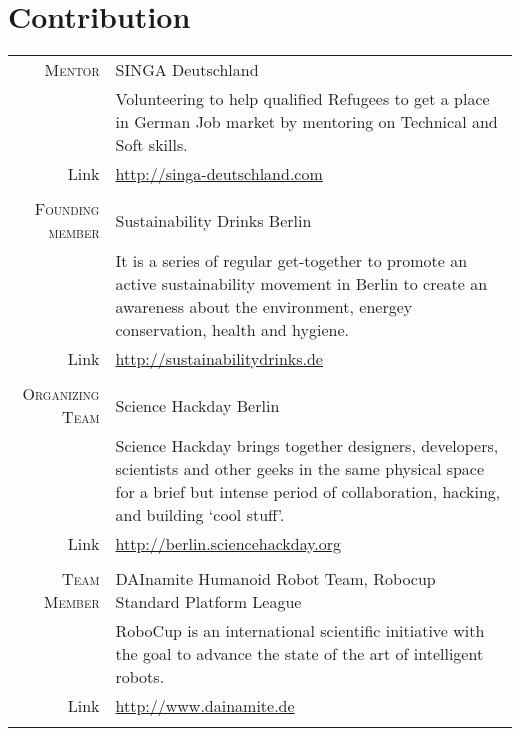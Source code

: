 \section{Contribution}
\begin{longtable}
	{r|p{11cm}} 
		
	\textsc{Mentor} & SINGA Deutschland\\
	&\footnotesize{Volunteering  to help qualified Refugees to get a place in German Job market by mentoring on Technical and Soft skills.}\\
	\footnotesize{Link}&\footnotesize{\url{http://singa-deutschland.com}}\\
	\multicolumn{2}{c}{} \\
	
	\textsc{Founding member} & Sustainability Drinks Berlin\\
	&\footnotesize{It is a series of regular get-together to promote an active sustainability movement in Berlin to create an awareness about the environment, energey conservation, health and hygiene.}\\
	\footnotesize{Link}&\footnotesize{\url{http://sustainabilitydrinks.de}}\\
	\multicolumn{2}{c}{} \\
	
	\textsc{Organizing Team} & Science Hackday Berlin\\
	&\footnotesize{Science Hackday brings together designers, developers, scientists and other geeks in the same physical space for a brief but intense period of collaboration, hacking, and building ‘cool stuff’.}\\
	\footnotesize{Link}&\footnotesize{\url{http://berlin.sciencehackday.org}}\\
	\multicolumn{2}{c}{} \\
	
	\textsc{Team Member} & DAInamite Humanoid Robot Team, Robocup Standard Platform League\\
	&\footnotesize{RoboCup is an international scientific initiative with the goal to advance the state of the art of intelligent robots.}\\
	\footnotesize{Link}&\footnotesize{\url{http://www.dainamite.de}}\\
	\multicolumn{2}{c}{} \\

\end{longtable}